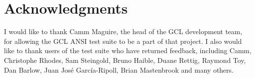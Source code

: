 \documentclass[11pt]{article}
\begin{document}
\section {Acknowledgments}

I would like to thank Camm Maguire, the head of the GCL development
team, for allowing the GCL ANSI test suite to be a part of that
project.  I also would like to thank users of the test suite who have
returned feedback, including Camm, Christophe Rhodes, Sam Steingold,
Bruno Haible, Duane Rettig, Raymond Toy, Dan Barlow, Juan Jos\'{e}
Garc\'{i}a-Ripoll, Brian Mastenbrook and many others.

\nocite{X3J13:94}
\nocite{McKeeman:98}
\nocite{DuranNtafos:81}
\nocite{KanerBondMcGee:04}
\nocite{Waters:91a}
\nocite{HildZeller:02a}
\nocite{BachSchroeder:04}
\nocite{Slutz:98}
\nocite{Lindig:05}
\nocite{Myers:79}



\end{document}

